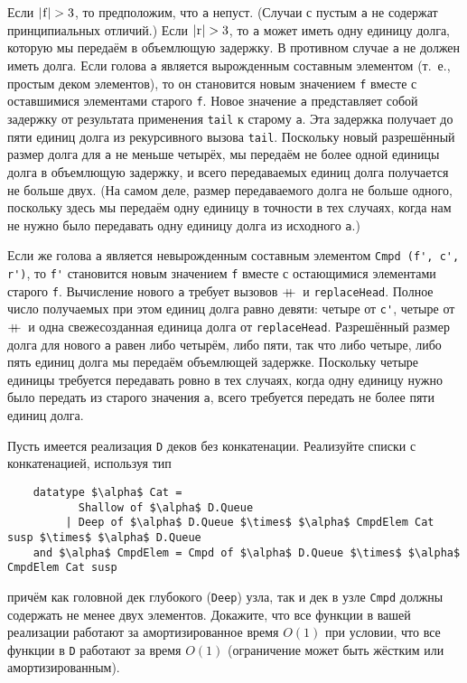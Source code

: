 \begin{theorem}
  Если $|\lstinline!f!| > 3$, то предположим, что \lstinline!a!
  непуст. (Случаи с пустым \lstinline!a! не содержат принципиальных
  отличий.) Если $|\lstinline!r!| > 3$, то \lstinline!a!
  может иметь одну единицу долга, которую мы передаём в объемлющую
  задержку. В противном случае \lstinline!a! не должен иметь
  долга. Если голова \lstinline!a! является вырожденным составным
  элементом (т.~е., простым деком элементов), то он становится новым
  значением \lstinline!f! вместе с оставшимися элементами старого
  \lstinline!f!. Новое значение \lstinline!a! представляет собой
  задержку от результата применения \lstinline!tail! к старому
  \lstinline!a!. Эта задержка получает до пяти единиц долга из
  рекурсивного вызова \lstinline!tail!. Поскольку новый разрешённый
  размер долга для \lstinline!a! не меньше четырёх, мы передаём не
  более одной единицы долга в объемлющую задержку, и всего
  передаваемых единиц долга получается не больше двух. (На самом деле,
  размер передаваемого долга не больше одного, поскольку здесь мы
  передаём одну единицу в точности в тех случаях, когда нам не нужно
  было передавать одну единицу долга из исходного \lstinline!a!.)

  Если же голова \lstinline!a! является невырожденным составным
  элементом \lstinline!Cmpd (f', c', r')!, то \lstinline!f'!
  становится новым значением \lstinline!f! вместе с остающимися
  элементами старого \lstinline!f!. Вычисление нового \lstinline!a!
  требует вызовов $+\!\!\!+\,$ и \lstinline!replaceHead!. Полное число
  получаемых при этом единиц долга равно девяти: четыре от
  \lstinline!c'!, четыре от $+\!\!\!+\,$ и одна свежесозданная единица
  долга от \lstinline!replaceHead!. Разрешённый размер долга для
  нового \lstinline!a! равен либо четырём, либо пяти, так что либо
  четыре, либо пять единиц долга мы передаём объемлющей
  задержке. Поскольку четыре единицы требуется передавать ровно в тех
  случаях, когда одну единицу нужно было передать из старого значения
  \lstinline!a!, всего требуется передать не более пяти единиц долга.
\end{theorem}

\begin{exercise}\label{ex:11.4}
  Пусть имеется реализация \lstinline!D! деков без
  конкатенации. Реализуйте списки с конкатенацией, используя тип
  \begin{lstlisting}
    datatype $\alpha$ Cat =
           Shallow of $\alpha$ D.Queue
         | Deep of $\alpha$ D.Queue $\times$ $\alpha$ CmpdElem Cat susp $\times$ $\alpha$ D.Queue
    and $\alpha$ CmpdElem = Cmpd of $\alpha$ D.Queue $\times$ $\alpha$ CmpdElem Cat susp
  \end{lstlisting}
  причём как головной дек глубокого (\lstinline!Deep!) узла, так и дек
  в узле \lstinline!Cmpd! должны содержать не менее двух
  элементов. Докажите, что все функции в вашей реализации работают за
  амортизированное время $O(1)$ при условии, что все функции в
  \lstinline!D! работают за время $O(1)$ (ограничение может быть
  жёстким или амортизированным).
\end{exercise}

